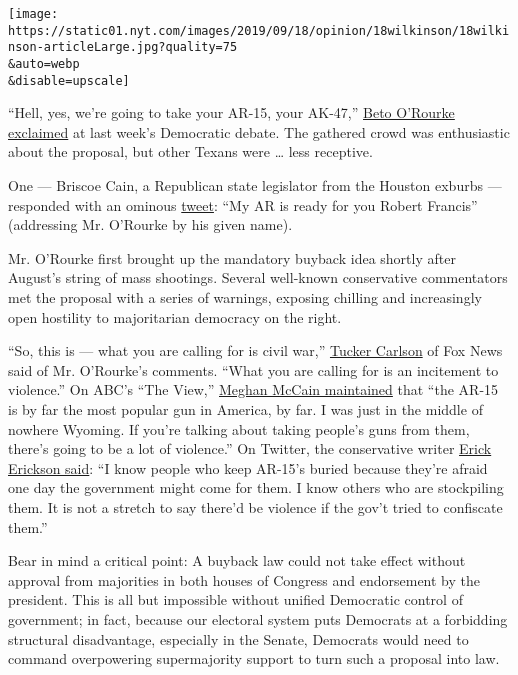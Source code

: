 \texttt{[image: https://static01.nyt.com/images/2019/09/18/opinion/18wilkinson/18wilkinson-articleLarge.jpg?quality=75\\\&auto=webp\\\&disable=upscale]}

``Hell, yes, we're going to take your AR-15, your AK-47,''
\href{https://www.nytimes.com/2019/09/12/us/orourke-debate-guns-take-ar15.html?smtyp=cur\&smid=tw-nytimes}{Beto
O'Rourke exclaimed} at last week's Democratic debate. The gathered crowd
was enthusiastic about the proposal, but other Texans were \ldots{} less
receptive.

One --- Briscoe Cain, a Republican state legislator from the Houston
exburbs --- responded with an ominous
\href{https://twitter.com/BetoORourke/status/1172359875093061632/photo/1}{tweet}:
``My AR is ready for you Robert Francis'' (addressing Mr. O'Rourke by
his given name).

Mr. O'Rourke first brought up the mandatory buyback idea shortly after
August's string of mass shootings. Several well-known conservative
commentators met the proposal with a series of warnings, exposing
chilling and increasingly open hostility to majoritarian democracy on
the right.

``So, this is --- what you are calling for is civil war,''
\href{https://www.mediamatters.org/tucker-carlson/tucker-carlson-says-gun-buyback-program-will-lead-civil-war}{Tucker
Carlson} of Fox News said of Mr. O'Rourke's comments. ``What you are
calling for is an incitement to violence.'' On ABC's ``The View,''
\href{https://twitter.com/justinbaragona/status/1168928087163248640?ref_src=twsrc\%5Etfw\%7Ctwcamp\%5Etweetembed\%7Ctwterm\%5E1168928087163248640\&ref_url=https\%3A\%2F\%2Fwww.motherjones.com\%2Fpolitics\%2F2019\%2F09\%2Fbriscoe-cain-beto-orourke\%2F}{Meghan
McCain maintained} that ``the AR-15 is by far the most popular gun in
America, by far. I was just in the middle of nowhere Wyoming. If you're
talking about taking people's guns from them, there's going to be a lot
of violence.'' On Twitter, the conservative writer
\href{https://twitter.com/EWErickson/status/1169339895002914816}{Erick
Erickson said}: ``I know people who keep AR-15's buried because they're
afraid one day the government might come for them. I know others who are
stockpiling them. It is not a stretch to say there'd be violence if the
gov't tried to confiscate them.''

Bear in mind a critical point: A buyback law could not take effect
without approval from majorities in both houses of Congress and
endorsement by the president. This is all but impossible without unified
Democratic control of government; in fact, because our electoral system
puts Democrats at a forbidding structural disadvantage, especially in
the Senate, Democrats would need to command overpowering supermajority
support to turn such a proposal into law.


